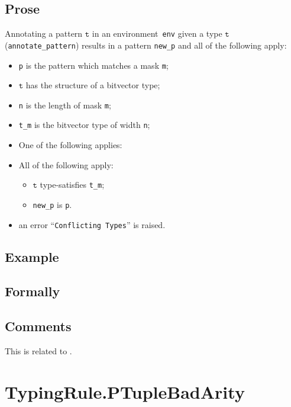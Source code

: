 \documentclass{book}
\newcommand\vt[0]{\texttt{t}}
\begin{document}
\begin{itemize}
  \subsection{Prose}
   Annotating a pattern $\vt$ in an environment~\texttt{env} given a type $\vt$ (\texttt{annotate\_pattern}) results in a pattern \texttt{new\_p} and all of the following apply:
   \begin{itemize}
   \item \texttt{p} is the pattern which matches a mask \texttt{m};
   \item $\vt$ has the structure of a bitvector type;
   \item \texttt{n} is the length of mask \texttt{m};
   \item \texttt{t\_m} is the bitvector type of width \texttt{n};
   \item One of the following applies:
     \item All of the following apply:
       \begin{itemize}
       \item $\vt$ type-satisfies \texttt{t\_m};
       \item \texttt{new\_p} is \texttt{p}.
       \end{itemize}
     \item an error ``\texttt{Conflicting Types}'' is raised.
   \end{itemize}

  \subsection{Example}



\begin{emptyformal}
    \subsection{Formally}
\end{emptyformal}

\subsection{Comments}
  This is related to .

\section{TypingRule.PTupleBadArity \label{sec:TypingRule.PTupleBadArity}}


\end{itemize}
\end{document}

